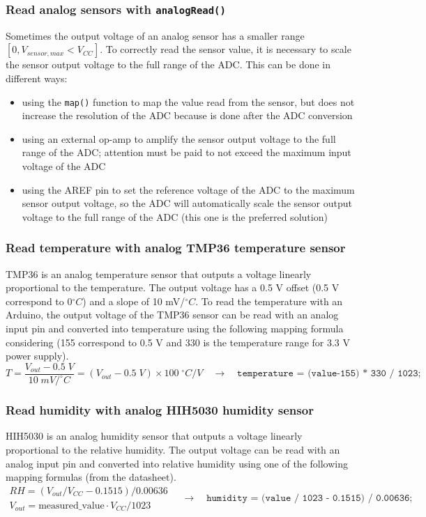 \subsubsection*{Read analog sensors with \texttt{analogRead()}}
Sometimes the output voltage of an analog sensor has a smaller range \([0, V_{sensor,max} < V_{CC}]\). To correctly read the
sensor value, it is necessary to scale the sensor output voltage to the full range of the ADC. This can be done in different ways:
\begin{itemize}
	\item using the \texttt{map()} function to map the value read from the sensor, but does not increase the resolution of the ADC
	because is done after the ADC conversion
	\item using an external op-amp to amplify the sensor output voltage to the full range of the ADC; attention must be paid to
	not exceed the maximum input voltage of the ADC
	\item using the AREF pin to set the reference voltage of the ADC to the maximum sensor output voltage, so the ADC will
	automatically scale the sensor output voltage to the full range of the ADC (this one is the preferred solution)
\end{itemize}

\subsubsection*{Read temperature with analog TMP36 temperature sensor}
TMP36 is an analog temperature sensor that outputs a voltage linearly proportional to the temperature. The output voltage has
a 0.5 V offset (0.5 V correspond to 0\(^\circ C\)) and a slope of 10 mV/\(^\circ C\).
To read the temperature with an Arduino, the output voltage of the TMP36 sensor can be read with an analog input pin and
converted into temperature using the following mapping formula considering (155 correspond to 0.5 V and 330 is the temperature
range for 3.3 V power supply).
\[T = \frac{V_{out} - 0.5 \; V}{10 \; mV/^\circ C} = (V_{out} - 0.5 \; V) \times 100 \; ^\circ C/V \quad \rightarrow \quad \texttt{temperature = (value-155) * 330 / 1023;}\]

\subsubsection*{Read humidity with analog HIH5030 humidity sensor}
HIH5030 is an analog humidity sensor that outputs a voltage linearly proportional to the relative humidity. The output voltage
can be read with an analog input pin and converted into relative humidity using one of the following mapping formulas (from the datasheet).
\[\begin{array}{c}
	RH = (V_{out} / V_{CC} - 0.1515) / 0.00636 \\[5pt]
	V_{out} = \text{measured\_value} \cdot V_{CC} / 1023
\end{array} \quad \rightarrow \quad \texttt{humidity = (value / 1023 - 0.1515) / 0.00636;}\]

